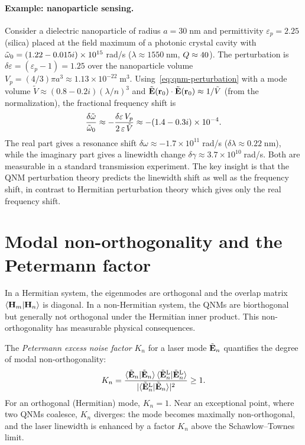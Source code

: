 \paragraph{Example: nanoparticle sensing.}
Consider a dielectric nanoparticle of radius $a = 30\;$nm and
permittivity $\varepsilon_p = 2.25$ (silica) placed at the field maximum
of a photonic crystal cavity with $\tilde{\omega}_0 = (1.22 - 0.015i) \times
10^{15}\;$rad/s ($\lambda \approx 1550\;$nm, $Q \approx 40$). The
perturbation is $\delta\varepsilon = (\varepsilon_p - 1) = 1.25$ over
the nanoparticle volume $V_p = (4/3)\pi a^3 \approx 1.13 \times
10^{-22}\;$m$^3$. Using~\eqref{eq:qnm-perturbation} with a mode
volume $\tilde{V} \approx (0.8 - 0.2i)(\lambda/n)^3$ and
$\tilde{\mathbf{E}}(\mathbf{r}_0) \cdot \tilde{\mathbf{E}}(\mathbf{r}_0) \approx 1/\tilde{V}$
(from the normalization), the fractional frequency shift is
\begin{equation}
 \frac{\delta\tilde{\omega}}{\tilde{\omega}_0} \approx
 -\frac{\delta\varepsilon\,V_p}{2\,\varepsilon\,\tilde{V}}
 \approx -(1.4 - 0.3i) \times 10^{-4}.
 \label{eq:sensing-shift}
\end{equation}
The real part gives a resonance shift
$\delta\omega \approx -1.7 \times 10^{11}\;$rad/s ($\delta\lambda
\approx 0.22\;$nm), while the imaginary part gives a linewidth change
$\delta\gamma \approx 3.7 \times 10^{10}\;$rad/s. Both are
measurable in a standard transmission experiment. The key insight is
that the QNM perturbation theory predicts the linewidth shift as well
as the frequency shift, in contrast to Hermitian perturbation theory
which gives only the real frequency shift.


\section{Modal non-orthogonality and the Petermann factor}
\label{sec:petermann}

In a Hermitian system, the eigenmodes are orthogonal and the overlap
matrix $\langle\mathbf{H}_m|\mathbf{H}_n\rangle$ is diagonal. In a non-Hermitian
system, the QNMs are biorthogonal but generally not orthogonal under the
Hermitian inner product. This non-orthogonality has measurable physical
consequences.

The \emph{Petermann excess noise factor} $K_n$ for a laser mode
$\tilde{\mathbf{E}}_n$ quantifies the degree of modal non-orthogonality:
\begin{equation}
 K_n = \frac{
 \langle\tilde{\mathbf{E}}_n|\tilde{\mathbf{E}}_n\rangle\,
 \langle\tilde{\mathbf{E}}_n^{\mathrm{L}}|\tilde{\mathbf{E}}_n^{\mathrm{L}}\rangle
 }{
 |\langle\tilde{\mathbf{E}}_n^{\mathrm{L}}|\tilde{\mathbf{E}}_n\rangle|^2
 } \ge 1.
 \label{eq:petermann}
\end{equation}
For an orthogonal (Hermitian) mode, $K_n = 1$. Near an exceptional
point, where two QNMs coalesce, $K_n$ diverges: the mode becomes
maximally non-orthogonal, and the laser linewidth is enhanced by a factor
$K_n$ above the Schawlow--Townes limit.

